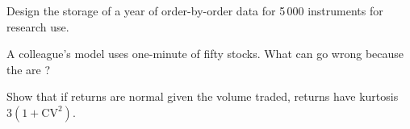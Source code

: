 \begin{interviewq}\label{iq:rs:market-data-for-research:4}
Design the storage of a year of order-by-order data for 5\,000 instruments for research use.
\end{interviewq}

\begin{interviewq}\label{iq:rs:market-data-for-research:5}
A colleague's model uses one-minute  of fifty stocks. What can go wrong because the  are ?
\end{interviewq}

\begin{interviewq}\label{iq:rs:market-data-for-research:6}
Show that if returns are normal given the volume traded,  returns have kurtosis $3(1 + \mathrm{CV}^2)$.
\end{interviewq}
